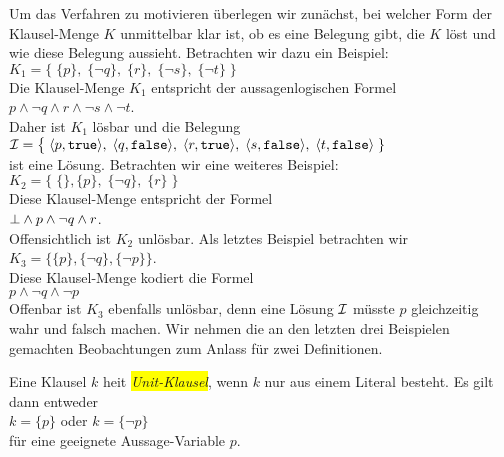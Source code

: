 Um das Verfahren zu motivieren \"{u}berlegen wir zun\"{a}chst, bei welcher Form der Klausel-Menge $K$
unmittelbar klar ist, ob es eine Belegung gibt, die $K$ l\"{o}st und wie diese Belegung
aussieht.  Betrachten wir dazu ein Beispiel: \\[0.2cm]
\hspace*{1.3cm} 
$K_1 = \bigl\{\; \{p\},\; \{\neg q\},\; \{r\},\; \{\neg s\}, \; \{\neg t\} \;\bigr\}$ 
\\[0.2cm]
Die Klausel-Menge $K_1$ entspricht der aussagenlogischen Formel
\\[0.2cm]
\hspace*{1.3cm}
$p \wedge \neg q \wedge r \wedge \neg s \wedge \neg t$.
\\[0.2cm]
Daher ist $K_1$ l\"{o}sbar und die Belegung  \\[0.2cm]
\hspace*{1.3cm} 
$\I = \bigl\{\; \pair(p, \mathtt{true}),\; \pair(q, \mathtt{false}),\;\pair(r, \mathtt{true}),\; \pair(s, \mathtt{false}),\; \pair(t, \mathtt{false})\;\}$
\\[0.2cm]
ist eine L\"{o}sung.  Betrachten wir eine weiteres Beispiel: \\[0.2cm]
\hspace*{1.3cm} 
$K_2 = \bigl\{\; \{\}, \{p\},\; \{\neg q\},\; \{r\}\; \bigr\}$ 
\\[0.2cm]
Diese Klausel-Menge entspricht der Formel
\\[0.2cm]
\hspace*{1.3cm}
$\bot \wedge p \wedge \neg q \wedge r$.
\\[0.2cm]
Offensichtlich ist $K_2$ unl\"{o}sbar.  Als letztes Beispiel betrachten wir 
\\[0.2cm]
\hspace*{1.3cm} $K_3 = \bigl\{ \{p\}, \{\neg q\}, \{\neg p\} \bigr\}$.
\\[0.2cm]
Diese Klausel-Menge kodiert die Formel
\\[0.2cm]
\hspace*{1.3cm}
$p \wedge \neg q \wedge \neg p $
\\[0.2cm]
Offenbar ist $K_3$ ebenfalls unl\"{o}sbar, denn eine L\"{o}sung $\mathcal{I}$ m\"{u}sste $p$ gleichzeitig
wahr und falsch machen.
Wir nehmen die an den letzten drei Beispielen gemachten Beobachtungen zum Anlass f\"{u}r zwei Definitionen.

\begin{Definition}
  Eine Klausel $k$ hei\3t \colorbox{yellow}{\emph{Unit-Klausel}}, wenn $k$ nur aus einem Literal besteht.
  Es gilt dann entweder
  \\[0.2cm]
  \hspace*{1.3cm}
  $k = \{p\}$ \quad oder \quad $k = \{\neg p\}$ 
  \\[0.2cm]
  f\"{u}r eine geeignete Aussage-Variable $p$. \eox
\end{Definition}

